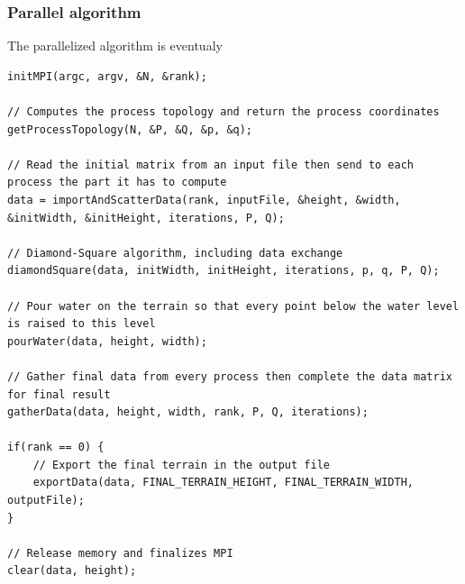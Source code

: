 \subsubsection{Parallel algorithm}
The parallelized algorithm is eventualy
\begin{lstlisting}
initMPI(argc, argv, &N, &rank);

// Computes the process topology and return the process coordinates
getProcessTopology(N, &P, &Q, &p, &q); 

// Read the initial matrix from an input file then send to each process the part it has to compute
data = importAndScatterData(rank, inputFile, &height, &width, &initWidth, &initHeight, iterations, P, Q);

// Diamond-Square algorithm, including data exchange
diamondSquare(data, initWidth, initHeight, iterations, p, q, P, Q);

// Pour water on the terrain so that every point below the water level is raised to this level
pourWater(data, height, width);

// Gather final data from every process then complete the data matrix for final result
gatherData(data, height, width, rank, P, Q, iterations);

if(rank == 0) {
    // Export the final terrain in the output file
    exportData(data, FINAL_TERRAIN_HEIGHT, FINAL_TERRAIN_WIDTH, outputFile);
}

// Release memory and finalizes MPI
clear(data, height);
\end{lstlisting}

